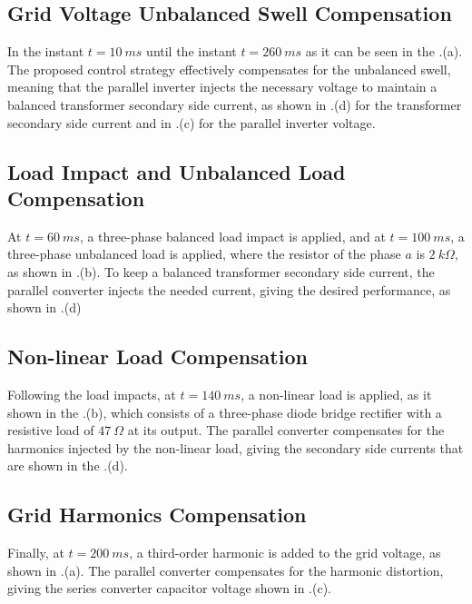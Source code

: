 \subsection{Grid Voltage Unbalanced Swell Compensation}

In the instant $t=10\ ms$ until the instant $t = 260\ ms$ as it can be seen in the .(a). The proposed control strategy effectively compensates for the unbalanced swell, meaning that the parallel inverter injects the necessary voltage to maintain a balanced transformer secondary side current, as shown in .(d) for the transformer secondary side current and in .(c) for the parallel inverter voltage. 

\subsection{Load Impact and Unbalanced Load Compensation}

At $t=60\ ms$, a three-phase balanced load impact is applied, and at $t=100\ ms$, a three-phase unbalanced load is applied, where the resistor of the phase $a$ is $2\ k\Omega$, as shown in .(b). To keep a balanced transformer secondary side current, the parallel converter injects the needed current, giving the desired performance, as shown in .(d)

\subsection{Non-linear Load Compensation}

Following the load impacts, at $t=140\ ms$, a non-linear load is applied, as it shown in the .(b), which consists of a three-phase diode bridge rectifier with a resistive load of $47\ \Omega$ at its output. The parallel converter compensates for the harmonics injected by the non-linear load, giving the secondary side currents that are shown in the .(d).

\subsection{Grid Harmonics Compensation}

Finally, at $t=200\ ms$, a third-order harmonic is added to the grid voltage, as shown in .(a). The parallel converter compensates for the harmonic distortion, giving the series converter capacitor voltage shown in .(c).